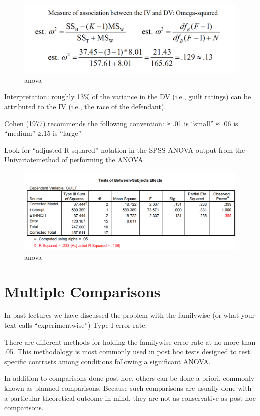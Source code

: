 \documentclass[]{book}
\theoremstyle{definition}
\theoremstyle{definition}
\theoremstyle{definition}
\theoremstyle{remark}
\begin{document}
\begin{figure}
\centering
\includegraphics{img/hicksanova15.png}
\caption{anova}
\end{figure}

Interpretation: roughly 13\% of the variance in the DV (i.e., guilt
ratings) can be attributed to the IV (i.e., the race of the defendant).

Cohen (1977) recommends the following convention: ≈ .01 is ``small'' ≈
.06 is ``medium'' ≥.15 is ``large''

Look for ``adjusted R squared'' notation in the SPSS ANOVA output from
the Univariatemethod of performing the ANOVA

\begin{figure}
\centering
\includegraphics{img/hicksanova14.png}
\caption{anova}
\end{figure}

\chapter{Multiple Comparisons}\label{multiple-comparisons}

In past lectures we have discussed the problem with the familywise (or
what your text calls ``experimentwise'') Type I error rate.

There are different methods for holding the familywise error rate at no
more than .05. This methodology is most commonly used in post hoc tests
designed to test specific contrasts among conditions following a
significant ANOVA.

In addition to comparisons done post hoc, others can be done a priori,
commonly known as planned comparisons. Because such comparisons are
usually done with a particular theoretical outcome in mind, they are not
as conservative as post hoc comparisons.
\end{document}
